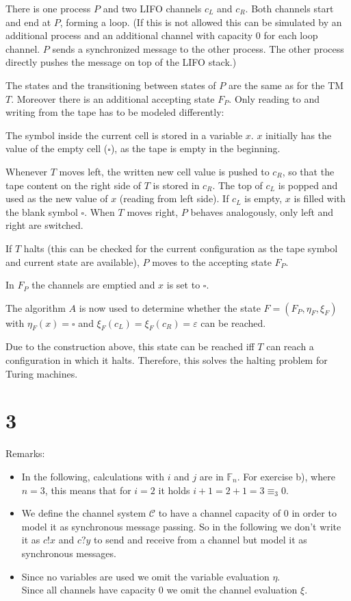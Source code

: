 \documentclass[11pt]{article}
\begin{document}
	There is one process $P$ and two LIFO channels $c_L$ and $c_R$. Both channels start and end at $P$, forming a loop.
	(If this is not allowed this can be simulated by an additional process and an additional channel with capacity 0 for each loop channel. $P$ sends a synchronized message to the other process. The other process directly pushes the message on top of the LIFO stack.)
	
	The states and the transitioning between states of $P$ are the same as for the TM $T$. Moreover there is an additional accepting state $F_P$. Only reading to and writing from the tape has to be modeled differently:
	
	The symbol inside the current cell is stored in a variable $x$. $x$ initially has the value of the empty cell ($\square$), as the tape is empty in the beginning.
	
	Whenever $T$ moves left, the written new cell value is pushed to $c_R$, so that the tape content on the right side of $T$ is stored in $c_R$.
	The top of $c_L$ is popped and used as the new value of $x$ (reading from left side). If $c_L$ is empty, $x$ is filled with the blank symbol $\square$.
	When $T$ moves right, $P$ behaves analogously, only left and right are switched.
	
	If $T$ halts (this can be checked for the current configuration as the tape symbol and current state are available), $P$ moves to the accepting state $F_P$.
	
	In $F_P$ the channels are emptied and $x$ is set to $\square$.
	
	The algorithm $A$ is now used to determine whether the state $F = (F_P, \eta_F, \xi_F)$ with $\eta_F (x) = \square$ and $\xi_F (c_L) = \xi_F (c_R) = \varepsilon$ can be reached.
	
	Due to the construction above, this state can be reached iff $T$ can reach a configuration in which it halts. Therefore, this solves the halting problem for Turing machines.
	
	
	\section{3}
	
	Remarks:
	
	\begin{itemize}
		\item In the following, calculations with $i$ and $j$ are in $\mathbb{F}_n$. For exercise b), where $n=3$, this means that for $i=2$ it holds $i+1=2+1=3\equiv_3 0$.
		\item We define the channel system $\mathcal{C}$ to have a channel capacity of 0 in order to model it as synchronous message passing. So in the following we don't write it as $c!x$ and $c?y$ to send and receive from a channel but model it as synchronous messages.
		\item Since no variables are used we omit the variable evaluation $\eta$.\\
		Since all channels have capacity 0 we omit the channel evaluation $\xi$.
	\end{itemize}
	
\end{document}
